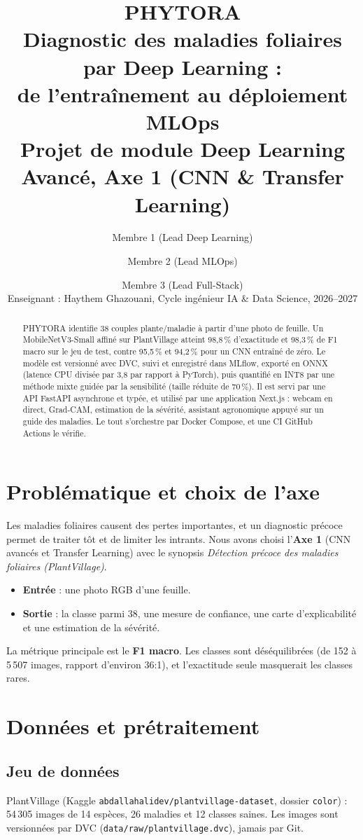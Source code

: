 \documentclass[11pt,a4paper]{article}
\title{\textbf{PHYTORA}\\[4pt]\large Diagnostic des maladies foliaires par Deep Learning :\\ de l'entraînement au déploiement MLOps\\[6pt]
\normalsize Projet de module Deep Learning Avancé, Axe 1 (CNN \& Transfer Learning)}
\author{Membre 1 (Lead Deep Learning) \and Membre 2 (Lead MLOps) \and Membre 3 (Lead Full-Stack)\\[4pt]
Enseignant : Haythem Ghazouani, Cycle ingénieur IA \& Data Science, 2026--2027}
\date{}
\begin{document}
\maketitle
\begin{abstract}
PHYTORA identifie 38 couples plante/maladie à partir d'une photo de feuille. Un MobileNetV3-Small affiné sur PlantVillage atteint 98,8\,\% d'exactitude et 98,3\,\% de F1 macro sur le jeu de test, contre 95,5\,\% et 94,2\,\% pour un CNN entraîné de zéro. Le modèle est versionné avec DVC, suivi et enregistré dans MLflow, exporté en ONNX (latence CPU divisée par 3,8 par rapport à PyTorch), puis quantifié en INT8 par une méthode mixte guidée par la sensibilité (taille réduite de 70\,\%). Il est servi par une API FastAPI asynchrone et typée, et utilisé par une application Next.js : webcam en direct, Grad-CAM, estimation de la sévérité, assistant agronomique appuyé sur un guide des maladies. Le tout s'orchestre par Docker Compose, et une CI GitHub Actions le vérifie.
\end{abstract}

\tableofcontents
\newpage

\section{Problématique et choix de l'axe}
Les maladies foliaires causent des pertes importantes, et un diagnostic précoce permet de traiter tôt et de limiter les intrants. Nous avons choisi l'\textbf{Axe 1} (CNN avancés et Transfer Learning) avec le synopsis \emph{Détection précoce des maladies foliaires (PlantVillage)}.
\begin{itemize}
  \item \textbf{Entrée} : une photo RGB d'une feuille.
  \item \textbf{Sortie} : la classe parmi 38, une mesure de confiance, une carte d'explicabilité et une estimation de la sévérité.
\end{itemize}
La métrique principale est le \textbf{F1 macro}. Les classes sont déséquilibrées (de 152 à 5\,507 images, rapport d’environ 36:1), et l'exactitude seule masquerait les classes rares.

\section{Données et prétraitement}
\subsection{Jeu de données}
PlantVillage (Kaggle \texttt{abdallahalidev/plantvillage-dataset}, dossier \texttt{color}) : 54\,305 images de 14 espèces, 26 maladies et 12 classes saines. Les images sont versionnées par DVC (\texttt{data/raw/plantvillage.dvc}), jamais par Git.
\end{document}
